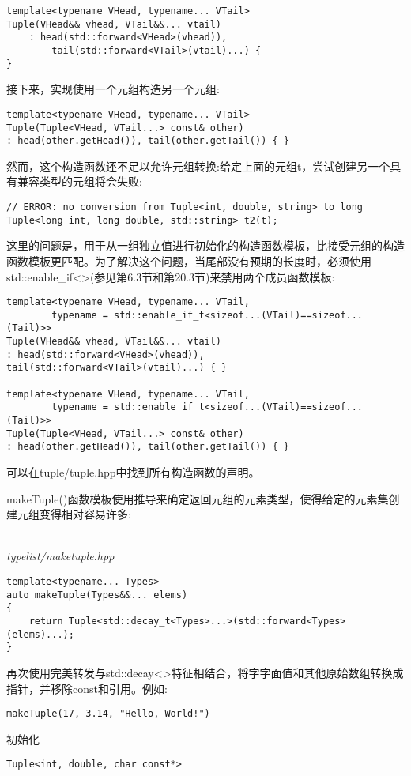 \begin{lstlisting}[style=styleCXX]
template<typename VHead, typename... VTail>
Tuple(VHead&& vhead, VTail&&... vtail)
	: head(std::forward<VHead>(vhead)),
		tail(std::forward<VTail>(vtail)...) {
}
\end{lstlisting}

接下来，实现使用一个元组构造另一个元组:

\begin{lstlisting}[style=styleCXX]
template<typename VHead, typename... VTail>
Tuple(Tuple<VHead, VTail...> const& other)
: head(other.getHead()), tail(other.getTail()) { }
\end{lstlisting}

然而，这个构造函数还不足以允许元组转换:给定上面的元组t，尝试创建另一个具有兼容类型的元组将会失败:

\begin{lstlisting}[style=styleCXX]
// ERROR: no conversion from Tuple<int, double, string> to long
Tuple<long int, long double, std::string> t2(t);
\end{lstlisting}

这里的问题是，用于从一组独立值进行初始化的构造函数模板，比接受元组的构造函数模板更匹配。为了解决这个问题，当尾部没有预期的长度时，必须使用std::enable\_if<>(参见第6.3节和第20.3节)来禁用两个成员函数模板:

\begin{lstlisting}[style=styleCXX]
template<typename VHead, typename... VTail,
		typename = std::enable_if_t<sizeof...(VTail)==sizeof...(Tail)>>
Tuple(VHead&& vhead, VTail&&... vtail)
: head(std::forward<VHead>(vhead)),
tail(std::forward<VTail>(vtail)...) { }

template<typename VHead, typename... VTail,
		typename = std::enable_if_t<sizeof...(VTail)==sizeof...(Tail)>>
Tuple(Tuple<VHead, VTail...> const& other)
: head(other.getHead()), tail(other.getTail()) { }
\end{lstlisting}

可以在tuple/tuple.hpp中找到所有构造函数的声明。

makeTuple()函数模板使用推导来确定返回元组的元素类型，使得给定的元素集创建元组变得相对容易许多:

\hspace*{\fill} \\ %
\noindent
\textit{typelist/maketuple.hpp}
\begin{lstlisting}[style=styleCXX]
template<typename... Types>
auto makeTuple(Types&&... elems)
{
	return Tuple<std::decay_t<Types>...>(std::forward<Types>(elems)...);
}
\end{lstlisting}

再次使用完美转发与std::decay<>特征相结合，将字字面值和其他原始数组转换成指针，并移除const和引用。例如:

\begin{lstlisting}[style=styleCXX]
makeTuple(17, 3.14, "Hello, World!")
\end{lstlisting}

初始化

\begin{lstlisting}[style=styleCXX]
Tuple<int, double, char const*>
\end{lstlisting}







